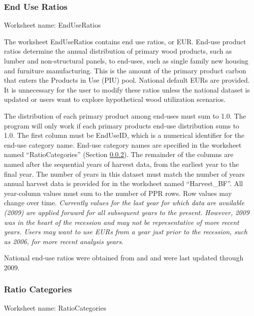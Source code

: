 \documentclass[
  openany]{book}
\begin{document}
\hypertarget{own-prov-input-eur}{%
\subsubsection{End Use Ratios}\label{own-prov-input-eur}}

Worksheet name: EndUseRatios

The worksheet EndUseRatios contains end use ratios, or EUR. End-use product ratios determine the annual distribution of primary wood products, such as lumber and non-structural panels, to end-uses, such as single family new housing and furniture manufacturing. This is the amount of the primary product carbon that enters the Products in Use (PIU) pool. National default EURs are provided. It is unnecessary for the user to modify these ratios unless the national dataset is updated or users want to explore hypothetical wood utilization scenarios.

The distribution of each primary product among end-uses must sum to 1.0. The program will only work if each primary products end-use distribution sums to 1.0. The first column must be EndUseID, which is a numerical identifier for the end-use category name. End-use category names are specified in the worksheet named ``RatioCategories'' (Section \ref{own-prov-input-rc}). The remainder of the columns are named after the sequential years of harvest data, from the earliest year to the final year. The number of years in this dataset must match the number of years annual harvest data is provided for in the worksheet named ``Harvest\_BF''. All year-column values must sum to the number of PPR rows. Row values may change over time. \emph{Currently values for the last year for which data are available (2009) are applied forward for all subsequent years to the present. However, 2009 was in the heart of the recession and may not be representative of more recent years. Users may want to use EURs from a year just prior to the recession, such as 2006, for more recent analysis years}.

National end-use ratios were obtained from \textcite{mckeever2009} and \textcite{mckeever2011} and were last updated through 2009.

\hypertarget{own-prov-input-rc}{%
\subsubsection{Ratio Categories}\label{own-prov-input-rc}}

Worksheet name: RatioCategories
\end{document}
